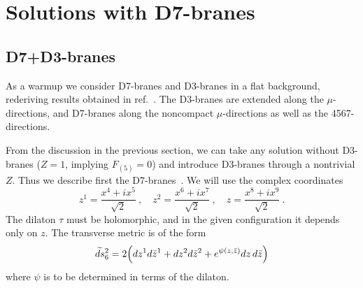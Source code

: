 \documentclass[a4paper,12pt]{article}
\renewcommand{\=}[1]{\bar{#1}}
\newcommand{\sect}[1]{\section{#1}\setcounter{equation}{0}}
\newcommand{\skyp}[1]{}
\begin{document}
\skyp{
We must now consider the compatibility of this constraint with the Bianchi
identity and with flux quantization.  Let us first consider the case of
constant $\tau$, where the Bianchi identity is simply that
$G{(3)}$ be closed; we are expanding upon remarks made in ref.~\cite{GP}.

For a K\"ahler manifold, the Laplacian takes
$(p,q)$ forms into $(p,q)$ forms, so the harmonic forms are of definite
type.  Harmonic forms are closed, so taking $G_{(3)}$ to be any harmonic
$(2,1)$ form satisfies the Bianchi identity.  The primitivity condition
$G_{ij}\!^j = 0$ is the vanishing of a harmonic $(1,0)$ form.  On a
compact Calabi-Yau manifold there are no such forms; more generally this
might impose a finite number of additional conditions.

The R-R $F_{(3)}$ and NS-NS $H_{(3)}$ are also harmonic, but are real and
quantized.  In general they are then linear combinations of three-forms of
all types, $(3,0)$, $(2,1)$, $(1,2)$, and $(0,3)$.  The condition that
$G_{(3)}$ be $(2,1)$ then gives a finite number of equations for the
coefficients (whereas in principle eq.~(\ref{21}) is an infinite number of
equations, since it must hold at every point), so the quantization, SUSY,
and Bianchi conditions will generically hold on a submanifold of moduli
space.
}

\sect{Solutions with D7-branes}

\subsection{D7+D3-branes}

As a warmup we consider D7-branes and D3-branes in a flat background, rederiving
results obtained in ref.~\cite{Aharonyetal}.  The D3-branes are extended
along the
$\mu$-directions, and D7-branes along the noncompact $\mu$-directions as well
as the 4567-directions.

From the discussion in the previous section, we can take any solution without
D3-branes ($Z=1$, implying $F_{(5)}=0$) and introduce D3-branes through a
nontrivial
$Z$.  Thus we describe first the D7-branes~\cite{stringycstrings}.  We will
use the complex coordinates
\begin{equation}
z^1=\frac{x^4+ix^5}{\sqrt2}\ ,\quad
z^2=\frac{x^6+ix^7}{\sqrt2}\ ,
\quad z=\frac{x^8+ix^9}{\sqrt2}\ .
\label{zdef}
\end{equation}
The dilaton $\tau$ must be holomorphic, and in the given configuration it
depends
only on $z$.
The transverse metric is of the form
\begin{equation}
\widetilde{ds}{}_6^{2}=2\Bigl(
dz^{1}d\bar{z}^{1}+ dz^{2}d\bar{z}^{2}+ e^{\psi(z,\bar{z})}
dz \,d\bar{z} \Bigr)
\label{metric}
\end{equation}
where $\psi$ is to be determined in terms of the dilaton.
\end{document}
